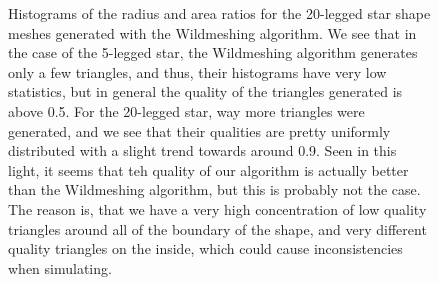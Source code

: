 \documentclass[acmtog]{acmart}
\begin{document}
\begin{figure}[H]
\begin{subfigure}{0.22\textwidth}
  \end{subfigure}
  \caption{Histograms of the radius and area ratios for the 20-legged star shape meshes generated with the Wildmeshing algorithm.
    We see that in the case of the 5-legged star, the Wildmeshing algorithm generates only a few triangles,
    and thus, their histograms have very low statistics, but in general the quality of the triangles generated is above 0.5.
    For the 20-legged star, way more triangles were generated, and we see that their qualities are pretty uniformly distributed with a slight trend towards around 0.9.
    Seen in this light, it seems that teh quality of our algorithm is actually better than the Wildmeshing algorithm,
    but this is probably not the case. The reason is, that we have a very high concentration of low quality triangles
    around all of the boundary of the shape, and very different quality triangles on the inside, which could cause inconsistencies when simulating.}
\end{figure}
\end{document}
